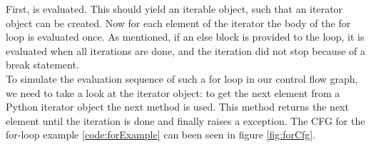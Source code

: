 First,  is evaluated. This should yield an iterable object, such that an iterator object can be created. Now for each element of the iterator the body of the for loop is evaluated once. As mentioned, if an else block is provided to the loop, it is evaluated when all iterations are done, and the iteration did not stop because of a break statement. \\
To simulate the evaluation sequence of such a for loop in our control flow graph, we need to take a look at the iterator object: to get the next element from a Python iterator object the next method is used. This method returns the next element until the iteration is done and finally raises a  exception. The CFG for the for-loop example \ref{code:forExample} can been seen in figure \ref{fig:forCfg}.

